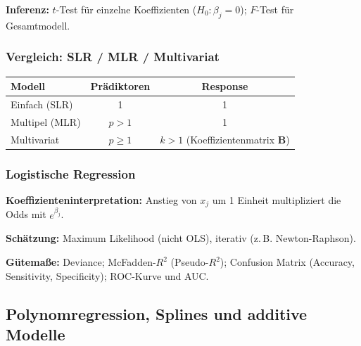 \textbf{Inferenz:} $t$-Test für einzelne Koeffizienten ($H_0: \beta_j = 0$); $F$-Test für Gesamtmodell.

\subsubsection*{Vergleich: SLR / MLR / Multivariat}

\begin{center}
\small
\begin{tabular}{|l|c|c|}
\hline
\textbf{Modell} & \textbf{Prädiktoren} & \textbf{Response} \\
\hline
Einfach (SLR) & 1 & 1 \\
Multipel (MLR) & $p > 1$ & 1 \\
Multivariat & $p \geq 1$ & $k > 1$ (Koeffizientenmatrix $\mathbf{B}$) \\
\hline
\end{tabular}
\end{center}

\subsubsection*{Logistische Regression}


\textbf{Koeffizienteninterpretation:} Anstieg von $x_j$ um 1 Einheit multipliziert die Odds mit $e^{\beta_j}$.

\textbf{Schätzung:} Maximum Likelihood (nicht OLS), iterativ (z.\,B. Newton-Raphson).

\textbf{Gütemaße:} Deviance; McFadden-$R^2$ (Pseudo-$R^2$); Confusion Matrix (Accuracy, Sensitivity, Specificity); ROC-Kurve und AUC.


\newpage

\subsection{Polynomregression, Splines und additive Modelle}

